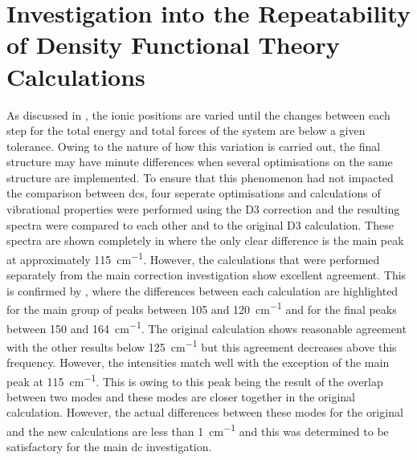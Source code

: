 \section{Investigation into the Repeatability of Density Functional Theory Calculations}
\label{sec:simstud}
As discussed in , the ionic positions are varied until the changes between each step for the total energy and total forces of the system are below a given tolerance. Owing to the nature of how this variation is carried out, the final structure may have minute differences when several optimisations on the same structure are implemented. To ensure that this phenomenon had not impacted the comparison between \acrshort{dc}s, four seperate optimisations and calculations of vibrational properties were performed using the D3 correction and the resulting spectra were compared to each other and to the original D3 calculation. These spectra are shown completely in  where the only clear difference is the main peak at approximately \SI{115}{cm^{-1}}. However, the calculations that were performed separately from the main correction investigation show excellent agreement. This is confirmed by , where the differences between each calculation are highlighted for the main group of peaks between 105 and \SI{120}{cm^{-1}} and for the final peaks between 150 and \SI{164}{cm^{-1}}. The original calculation shows reasonable agreement with the other results below \SI{125}{cm^{-1}} but this agreement decreases above this frequency. However, the intensities match well with the exception of the main peak at \SI{115}{cm^{-1}}. This is owing to this peak being the result of the overlap between two modes and these modes are closer together in the original calculation. However, the actual differences between these modes for the original and the new calculations are less than \SI{1}{cm^{-1}} and this was determined to be satisfactory for the main \acrshort{dc} investigation. 

